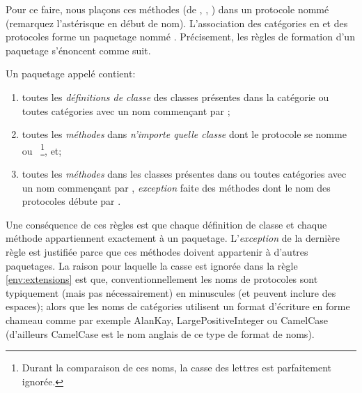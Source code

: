 \documentclass[a4paper,10pt,twoside]{book}
\begin{document}
Pour ce faire, nous plaçons ces méthodes (de , ,  \etc) dans un protocole nommé  (remarquez l'astérisque en début de nom). L'association des
catégories en  et des protocoles  
forme un paquetage nommé .
Précisement, les règles de formation d'un paquetage s'énoncent comme suit.

Un paquetage appelé  contient:

\begin{enumerate}		
	\item{} toutes les \emph{définitions de classe} des classes présentes dans
la catégorie  ou toutes catégories avec un nom commençant par
;
	\item{} \label{env:extensions} toutes les \emph{méthodes}
dans \emph{n'importe quelle classe} dont le protocole se nomme
 ou ~\footnote{Durant la comparaison
de ces noms, la casse des lettres est parfaitement ignorée.}, et;
\item{} toutes les \emph{méthodes} dans les classes présentes dans
 ou toutes catégories avec un nom commençant par , 
\emph{exception} faite des méthodes dont le nom des protocoles débute par 
\prot{*}.
\end{enumerate}

\noindent
Une conséquence de ces règles est que chaque définition de classe et chaque 
méthode appartiennent exactement à un paquetage. 
L'\emph{exception} de la dernière règle est justifiée parce que
ces méthodes doivent appartenir à d'autres paquetages.
La raison pour laquelle la casse
est ignorée dans la règle \ref{env:extensions} 
est que, conventionnellement les noms de protocoles sont typiquement
(mais pas nécessairement) en minuscules (et peuvent inclure des espaces); alors que 
les noms de catégories utilisent un format d'écriture en forme chameau comme par 
exemple AlanKay, LargePositiveInteger ou CamelCase (d'ailleurs CamelCase est 
le nom anglais de ce type de format de noms).
\end{document}

